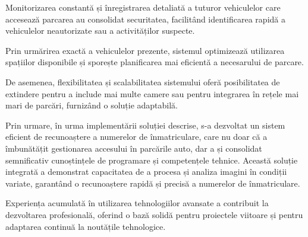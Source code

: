 \documentclass[a4paper,12pt]{report}
\begin{document}
Monitorizarea constantă și înregistrarea detaliată a tuturor vehiculelor care accesează parcarea au consolidat securitatea, facilitând identificarea rapidă a vehiculelor neautorizate sau a activităților suspecte.

Prin urmărirea exactă a vehiculelor prezente, sistemul optimizează utilizarea spațiilor disponibile și sporește planificarea mai eficientă a necesarului de parcare.

De asemenea, flexibilitatea și scalabilitatea sistemului oferă posibilitatea de extindere pentru a include mai multe camere sau pentru integrarea în rețele mai mari de parcări, furnizând o soluție adaptabilă.

Prin urmare, în urma implementării soluției descrise, s-a dezvoltat un sistem eficient de recunoaștere a numerelor de înmatriculare, care nu doar că a îmbunătățit gestionarea accesului în parcările auto, dar a și consolidat semnificativ cunoștințele de programare și competențele tehnice. Această soluție integrată a demonstrat capacitatea de a procesa și analiza imagini în condiții variate, garantând o recunoaștere rapidă și precisă a numerelor de înmatriculare.

Experiența acumulată în utilizarea tehnologiilor avansate a contribuit la dezvoltarea profesională, oferind o bază solidă pentru proiectele viitoare și pentru adaptarea continuă la noutățile tehnologice.



\cite{1}
\cite{2}
\cite{3}
\end{document}
